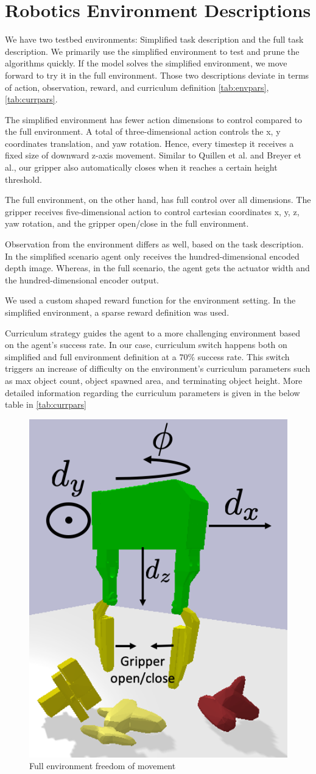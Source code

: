 \section{Robotics Environment Descriptions}

We have two testbed environments: Simplified task description and the full task description. We primarily use the simplified environment to test and prune the algorithms quickly. If the model solves the simplified environment, we move forward to try it in the full environment. Those two descriptions deviate in terms of action, observation, reward, and curriculum definition \ref{tab:envpars}, \ref{tab:currpars}. 

The simplified environment has fewer action dimensions to control compared to the full environment. A total of three-dimensional action controls the x, y coordinates translation, and yaw rotation. Hence, every timestep it receives a fixed size of downward z-axis movement. Similar to Quillen et al. and Breyer et al., our gripper also automatically closes when it reaches a certain height threshold.

The full environment, on the other hand, has full control over all dimensions. The gripper receives five-dimensional action to control cartesian coordinates x, y, z, yaw rotation, and the gripper open/close in the full environment. 

Observation from the environment differs as well, based on the task description. In the simplified scenario agent only receives the hundred-dimensional encoded depth image. Whereas, in the full scenario, the agent gets the actuator width and the hundred-dimensional encoder output.

We used a custom shaped reward function for the environment setting. In the simplified environment, a sparse reward definition was used.

Curriculum strategy guides the agent to a more challenging environment based on the agent's success rate. In our case, curriculum switch happens both on simplified and full environment definition at a \(70\%\) success rate. This switch triggers an increase of difficulty on the environment's curriculum parameters such as max object count, object spawned area, and terminating object height. More detailed information regarding the curriculum parameters is given in the below table in \ref{tab:currpars}

\begin{figure}[htbp]
    \centering
    \includegraphics[width=0.3\linewidth]{figures/freedomDim.png}
\caption{Full environment freedom of movement} \label{fig:breyer}

\end{figure}


